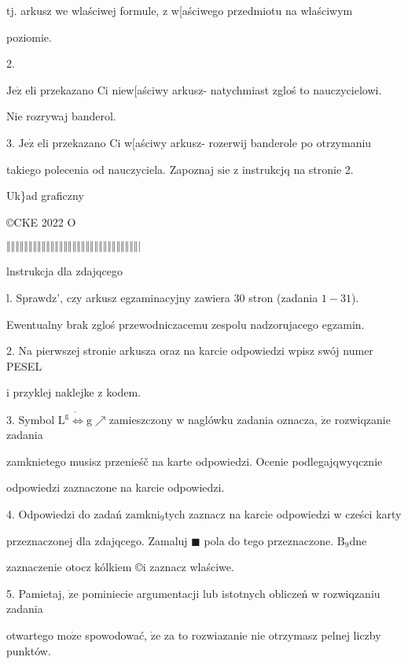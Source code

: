 \documentclass[a4paper,12pt]{article}
\begin{document}
tj. arkusz we wlaściwej formule, z w[aściwego przedmiotu na wlaściwym

poziomie.

2.

$\mathrm{J}\mathrm{e}\dot{\mathrm{z}}$ eli przekazano Ci niew[aściwy arkusz- natychmiast zgloś to nauczycielowi.

Nie rozrywaj banderol.

3. $\mathrm{J}\mathrm{e}\dot{\mathrm{z}}$ eli przekazano Ci w[aściwy arkusz- rozerwij banderole po otrzymaniu

takiego polecenia od nauczyciela. Zapoznaj $\mathrm{s}\mathrm{i}\mathrm{e}$ z instrukcjq na stronie 2.

Uk\}ad graficzny

\copyright CKE 2022 O

$\Vert\Vert\Vert\Vert\Vert\Vert\Vert\Vert\Vert\Vert\Vert\Vert\Vert\Vert\Vert\Vert\Vert\Vert\Vert\Vert\Vert\Vert\Vert\Vert\Vert\Vert\Vert\Vert\Vert\Vert|$




lnstrukcja dla zdajqcego

l. Sprawdz', czy arkusz egzaminacyjny zawiera 30 stron (zadania $1-31$).

Ewentualny brak zgloś przewodniczacemu zespolu nadzorujacego egzamin.

2. Na pierwszej stronie arkusza oraz na karcie odpowiedzi wpisz swój numer PESEL

i przyklej naklejke z kodem.

3. Symbol $\overline{\mathrm{L}^{\mathrm{g}}\Leftrightarrow \mathrm{g}}\nearrow$zamieszczony w naglówku zadania oznacza, $\dot{\mathrm{z}}\mathrm{e}$ rozwiqzanie zadania

zamknietego musisz przenieśč na karte odpowiedzi. Ocenie podlegajq$\mathrm{w}\mathrm{y}$qcznie

odpowiedzi zaznaczone na karcie odpowiedzi.

4. Odpowiedzi do zadań $\mathrm{z}\mathrm{a}\mathrm{m}\mathrm{k}\mathrm{n}\mathrm{i}_{9}$tych zaznacz na karcie odpowiedzi w cześci karty

przeznaczonej dla zdajqcego. Zamaluj $\blacksquare$ pola do tego przeznaczone. $\mathrm{B}_{9}\mathrm{d}\mathrm{n}\mathrm{e}$

zaznaczenie otocz kólkiem \copyright i zaznacz wlaściwe.

5. Pamietaj, $\dot{\mathrm{z}}\mathrm{e}$ pominiecie argumentacji lub istotnych obliczeń w rozwiqzaniu zadania

otwartego $\mathrm{m}\mathrm{o}\dot{\mathrm{z}}\mathrm{e}$ spowodować, $\dot{\mathrm{z}}\mathrm{e}$ za to rozwiazanie nie otrzymasz pelnej liczby punktów.
\end{document}

